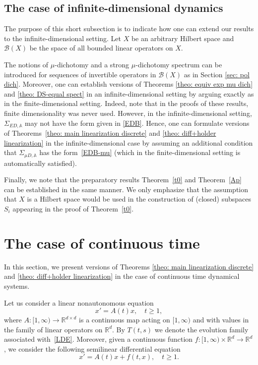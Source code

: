 \documentclass[reqno, a4paper, 10pt]{amsart}
\theoremstyle{plain}
\numberwithin{equation}{section}
\theoremstyle{remark}
\def\R{\mathbb{R}}
\begin{document}
\subsection{The case of infinite-dimensional dynamics}\label{sec: inf dim discrete} 
The purpose of this short subsection is to indicate how one can extend our results to the infinite-dimensional setting. Let $X$ be an arbitrary Hilbert space and $\mathcal B(X)$ be the space of all bounded linear operators on $X$.  

The notions of $\mu$-dichotomy and a strong $\mu$-dichotomy spectrum can be introduced for sequences of invertible operators in $\mathcal B(X)$ as in Section \ref{sec: pol dich}. Moreover, one can establish versions of Theorems \ref{theo: equiv exp mu dich} and \ref{theo: DS-equal spect} in an infinite-dimensional setting by arguing exactly as in the finite-dimensional setting. Indeed, note that in the proofs of these results, finite dimensionality was never used.
However, in the infinite-dimensional setting, $\Sigma_{ED, \mathbb A}$ may not have the form given in \eqref{EDB}. Hence, one can formulate versions of Theorems~\ref{theo: main linearization discrete}
and \ref{theo: diff+holder linearization} in the infinite-dimensional case by assuming an additional condition that $\Sigma_{\mu D, \mathbb A}$ has the form~\eqref{EDB-mu} (which in the finite-dimensional setting is automatically satisfied).





Finally, we note that the preparatory results Theorem~\ref{t0} and Theorem~\ref{Ap} can be established in the same manner. We only emphasize that the assumption that $X$ is a Hilbert space would be used in the construction of (closed) subspaces $S_i$ appearing in the proof of Theorem~\ref{t0}.


\section{The case of continuous time}\label{sec: continuous time case}
In this section, we present versions of Theorems \ref{theo: main linearization discrete} and \ref{theo: diff+holder linearization} in the case of continuous time dynamical systems. 

Let us consider a linear nonautonomous equation 
\begin{equation}\label{LDE}
x'=A(t)x, \quad t\ge 1,
\end{equation}
where $A:[1,\infty)\to \R^{d\times d}$ is a continuous map acting on $[1, \infty)$ and with values in the family of linear operators on $\R^d$. By $T(t,s)$ we denote the evolution family associated with~\eqref{LDE}.
 Moreover, given a continuous function  $f\colon [1, \infty) \times \R^d \to \R^d$, we consider the following semilinear differential equation
\begin{equation}\label{NDE}
x'=A(t)x+f(t,x), \quad t\ge 1.
\end{equation}
\end{document}
